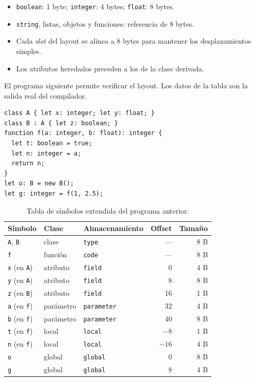 \documentclass[11pt,a4paper]{article}
\begin{document}
\begin{itemize}[leftmargin=1.4em]
  \item \texttt{boolean}: 1 byte; \texttt{integer}: 4 bytes; \texttt{float}: 8
        bytes.
  \item \texttt{string}, listas, objetos y funciones: referencia de 8 bytes.
  \item Cada \emph{slot} del layout se alinea a 8 bytes para mantener los
        desplazamientos simples.
  \item Los atributos heredados preceden a los de la clase derivada.
\end{itemize}

El programa siguiente permite verificar el layout. Los datos de la tabla son la
salida real del compilador.

\begin{lstlisting}[language=Compiscript,caption={Programa usado para ilustrar offsets, tamaños y herencia.}]
class A { let x: integer; let y: float; }
class B : A { let z: boolean; }
function f(a: integer, b: float): integer {
  let t: boolean = true;
  let n: integer = a;
  return n;
}
let o: B = new B();
let g: integer = f(1, 2.5);
\end{lstlisting}

\begin{table}[H]
\centering
\small
\begin{tabular}{@{}lllrr@{}}
\toprule
\textbf{Símbolo} & \textbf{Clase} & \textbf{Almacenamiento} & \textbf{Offset} & \textbf{Tamaño} \\
\midrule
\texttt{A}, \texttt{B} & clase & \texttt{type} & --- & 8 B \\
\texttt{f} & función & \texttt{code} & --- & 8 B \\
\texttt{x} (en \texttt{A}) & atributo & \texttt{field} & 0 & 4 B \\
\texttt{y} (en \texttt{A}) & atributo & \texttt{field} & 8 & 8 B \\
\texttt{z} (en \texttt{B}) & atributo & \texttt{field} & 16 & 1 B \\
\texttt{a} (en \texttt{f}) & parámetro & \texttt{parameter} & 32 & 4 B \\
\texttt{b} (en \texttt{f}) & parámetro & \texttt{parameter} & 40 & 8 B \\
\texttt{t} (en \texttt{f}) & local & \texttt{local} & $-8$ & 1 B \\
\texttt{n} (en \texttt{f}) & local & \texttt{local} & $-16$ & 4 B \\
\texttt{o} & global & \texttt{global} & 0 & 8 B \\
\texttt{g} & global & \texttt{global} & 8 & 4 B \\
\bottomrule
\end{tabular}
\caption{Tabla de símbolos extendida del programa anterior.}
\end{table}
\end{document}
